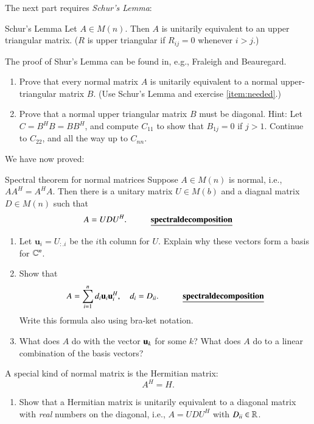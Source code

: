 \documentclass[12pt]{report}
\begin{document}
The next part requires \emph{Schur's Lemma}:
\begin{myLemma}{Schur's Lemma}{}
Let $A \in M(n)$. Then $A$ is unitarily equivalent to an upper triangular matrix. ($R$ is upper triangular if $R_{ij}=0$ whenever $i > j$.)
\end{myLemma}
The proof of Shur's Lemma can be found in, e.g., Fraleigh and Beauregard.

\begin{enumerate}[resume]
\item Prove that every normal matrix $A$ is unitarily equivalent to a normal upper-triangular matrix $B$. (Use Schur's Lemma and exercise \ref{item:needed}.)
\item Prove that a normal upper triangular matrix $B$ must be diagonal. Hint: Let $C = B^H B = BB^H$, and compute $C_{11}$ to show that $B_{1j} = 0$ if $j > 1$. Continue to $C_{22}$, and all the way up to $C_{nn}$.
\end{enumerate}

We have now proved:
\begin{myTheorem}{Spectral theorem for normal matrices}{}
    Suppose $A \in M(n)$ is normal, i.e., $AA^H = A^H A$. Then there is a unitary matrix $U \in M(b)$ and a diagnal matrix $D \in M(n)$ such that
    \begin{equation}
        A = U D U^H. \axiomname{spectral decomposition}
    \end{equation}
\end{myTheorem}

\begin{enumerate}[resume]
    \item Let $\mathbf{u}_i = U_{:.i}$ be the $i$th column for $U$. Explain why these vectors form a basis for $\mathbb{C}^n$.
    \item Show that
    \begin{equation}
        A = \sum_{i=1}^n d_i \mathbf{u}_i \mathbf{u}_i^H, \quad d_i = D_{ii}. \axiomname{spectral decomposition}
    \end{equation}
    Write this formula also using bra-ket notation.
    \item
        What does $A$ do with the vector $\mathbf{u}_k$ for some $k$? What does $A$ do to a linear combination of the basis vectors?
\end{enumerate}

A special kind of normal matrix is the Hermitian matrix:
\begin{equation}
    A^H = H.
\end{equation}
\begin{enumerate}[resume]
    \item Show that a Hermitian matrix is unitarily equivalent to a diagonal matrix with \emph{real} numbers on the diagonal, i.e., $A = U D U^H$ with $D_{ii} \in \mathbb{R}$.
\end{enumerate}
\end{document}
